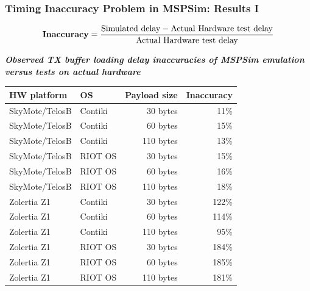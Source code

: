 \documentclass[10pt,c]{beamer}
\newcommand{\tblcaption}[1]{\textbf{\textsl{\small#1}}\vspace{0.1cm}}
\begin{document}
\begin{frame}
\frametitle{Timing Inaccuracy Problem in MSPSim: Results I}
\begin{center}
\vspace{-0.9cm}
\small
\[
\mbox{\textbf{Inaccuracy}}
   = \frac{\mbox{Simulated delay} - \mbox{Actual Hardware test delay}}
          {\mbox{Actual Hardware test delay}}
\]

\vspace{0.1cm}

\tblcaption{\small Observed TX buffer loading delay inaccuracies of MSPSim
            emulation \\ versus tests on actual hardware}
\begin{tabular}{|l|l|r|r|}
\hline
\textbf{HW platform} & \textbf{OS} & \textbf{Payload size}
                     & \textbf{Inaccuracy} \\
\hline
SkyMote/TelosB & Contiki &  30 bytes &  11\% \\
SkyMote/TelosB & Contiki &  60 bytes &  15\% \\
SkyMote/TelosB & Contiki & 110 bytes &  13\% \\
\hline
SkyMote/TelosB & RIOT OS &  30 bytes &  15\% \\
SkyMote/TelosB & RIOT OS &  60 bytes &  16\% \\
SkyMote/TelosB & RIOT OS & 110 bytes &  18\% \\
\hline
Zolertia Z1    & Contiki &  30 bytes & 122\% \\
Zolertia Z1    & Contiki &  60 bytes & 114\% \\
Zolertia Z1    & Contiki & 110 bytes &  95\% \\
\hline
Zolertia Z1    & RIOT OS &  30 bytes & 184\% \\
Zolertia Z1    & RIOT OS &  60 bytes & 185\% \\
Zolertia Z1    & RIOT OS & 110 bytes & 181\% \\
\hline
\end{tabular}
\end{center}
\end{frame}
\end{document}
